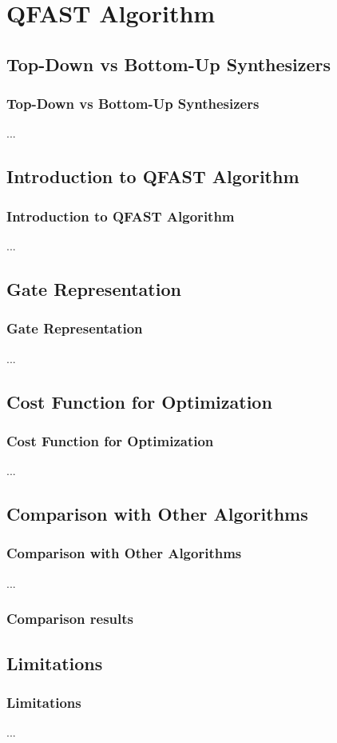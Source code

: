 \documentclass[aspectratio=1610]{beamer}
\begin{document}
\section{QFAST Algorithm}

\subsection{Top-Down vs Bottom-Up Synthesizers}
\begin{frame}
\frametitle{Top-Down vs Bottom-Up Synthesizers}
...
\end{frame}

\subsection{Introduction to QFAST Algorithm}
\begin{frame}
\frametitle{Introduction to QFAST Algorithm}
...
\end{frame}

\subsection{Gate Representation}
\begin{frame}
\frametitle{Gate Representation}
...
\end{frame}

\subsection{Cost Function for Optimization}
\begin{frame}
\frametitle{Cost Function for Optimization}
...
\end{frame}

\subsection{Comparison with Other Algorithms}
\begin{frame}
\frametitle{Comparison with Other Algorithms}
...
\end{frame}
\begin{frame}
\frametitle{Comparison results}
\end{frame}
\subsection{Limitations}
\begin{frame}
\frametitle{Limitations}
...
\end{frame}
\end{document}
